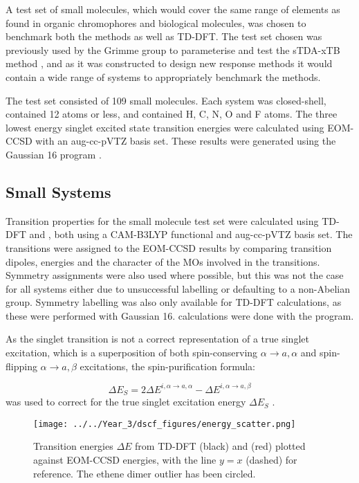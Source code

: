 A test set of small molecules, which would cover the same range of elements as found
in organic chromophores and biological molecules, was chosen to benchmark both the
\dscf methods as well as TD-DFT. The test set chosen was previously used by the 
Grimme group to parameterise and test the sTDA-xTB method \cite{Grimme2017}, and
as it was constructed to design new response methods it would contain a wide range
of systems to appropriately benchmark the \dscf methods.

The test set consisted of 109 small molecules. Each system was closed-shell, contained
12 atoms or less, and contained H, C, N, O and F atoms. The three lowest energy
singlet excited state transition energies were calculated using EOM-CCSD with an
aug-cc-pVTZ basis set. These results were generated using the Gaussian 16 program
\cite{Gaussian16}.

\subsection{Small Systems}
\label{subsec:smalltest}
Transition properties for the small molecule test set were calculated using TD-DFT 
and \dscf, both using a CAM-B3LYP functional and aug-cc-pVTZ basis set. The transitions
were assigned to the EOM-CCSD results by comparing transition dipoles, energies and 
the character of the MOs involved in the transitions. Symmetry assignments were
also used where possible, but this was not the case for all systems either due to
unsuccessful labelling or defaulting to a non-Abelian group. Symmetry labelling 
was also only available for TD-DFT calculations, as these were performed with Gaussian
16. \dscf calculations were done with the  program.

As the \dscf singlet transition is not a correct representation of a true singlet
excitation, which is a superposition of both spin-conserving $\alpha \rightarrow a,
\alpha$ and spin-flipping $\alpha \rightarrow a, \beta$ excitations, the spin-purification 
formula:

\begin{equation}
\Delta E_S = 2\Delta E^{i,\alpha \rightarrow a, \alpha} - \Delta E^{i,\alpha \rightarrow a, \beta}
\end{equation}
%
was used to correct for the true singlet excitation energy $\Delta E_S$ \cite{Ziegler1977}.

\begin{figure}
\centering
\texttt{[image: ../../Year\_3/dscf\_figures/energy\_scatter.png]}
\caption{Transition energies $\Delta E$ from TD-DFT (black) and \dscf (red)
 plotted against EOM-CCSD energies, with the line $y=x$ (dashed) for reference.
 The ethene dimer outlier has been circled.}
\label{fig:energy_scatter}
\end{figure}

